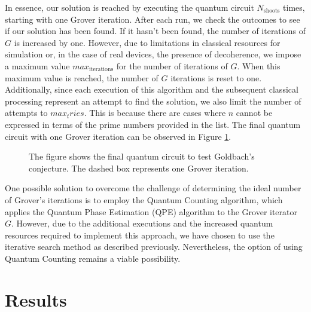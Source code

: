 \documentclass[12pt, a4paper]{article}
\begin{document}
    In essence, our solution is reached by executing the quantum circuit $N_{\text{shoots}}$ times, starting with one Grover iteration. After each run, we check the outcomes to see if our solution has been found. If it hasn't been found, the number of iterations of $G$ is increased by one. However, due to limitations in classical resources for simulation or, in the case of real devices, the presence of decoherence, we impose a maximum value $max_{\text{iterations}}$ for the number of iterations of $G$. When this maximum value is reached, the number of $G$ iterations is reset to one. Additionally, since each execution of this algorithm and the subsequent classical processing represent an attempt to find the solution, we also limit the number of attempts to $max_tries$. This is because there are cases where $n$ cannot be expressed in terms of the prime numbers provided in the list. The final quantum circuit with one Grover iteration can be observed in Figure \ref{fig:QCG}.

    \begin{figure}[h]
        \centering
        \caption{The figure shows the final quantum circuit to test Goldbach's conjecture. The dashed box represents one Grover iteration.}
        \label{fig:QCG}
    \end{figure}

    One possible solution to overcome the challenge of determining the ideal number of Grover's iterations is to employ the Quantum Counting algorithm, which applies the Quantum Phase Estimation (QPE) algorithm to the Grover iterator $G$. However, due to the additional executions and the increased quantum resources required to implement this approach, we have chosen to use the iterative search method as described previously. Nevertheless, the option of using Quantum Counting remains a viable possibility.

    \section{Results}
\end{document}
